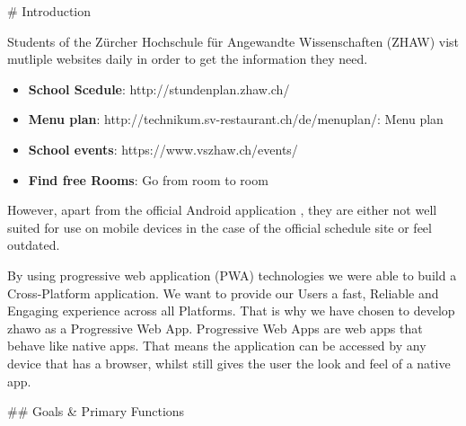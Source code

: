 \begin{markdown}

# Introduction

Students of the Zürcher Hochschule für Angewandte Wissenschaften (ZHAW) vist mutliple websites daily in order to get the information they need.

\begin{itemize}
  \item \textbf{School Scedule}: http://stundenplan.zhaw.ch/
  \item \textbf{Menu plan}: http://technikum.sv-restaurant.ch/de/menuplan/: Menu plan
  \item \textbf{School events}: https://www.vszhaw.ch/events/
  \item \textbf{Find free Rooms}: Go from room to room
\end{itemize}


However, apart from the official Android application \cite{DUMMY}, they are either not well suited for use on mobile devices in the case of the official schedule site \cite{DUMMY} or feel outdated.



By using progressive web application (PWA) technologies \cite{OurReadme} we were able to build a Cross-Platform application.
We want to provide our Users a fast, Reliable and Engaging experience across all Platforms. That is why we have chosen to develop zhawo as a Progressive Web App. Progressive Web Apps are web apps that behave like native apps. That means the application can be accessed by any device that has a browser, whilst still gives the user the look and feel of a native app.

## Goals & Primary Functions


\end{markdown}
